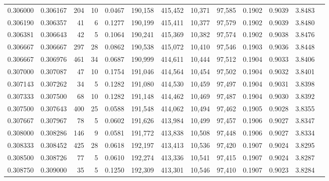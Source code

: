\begin{tabular}{rrrrrrrrrrrrr}
0.306000 & 0.306167 &   204 &  10 &                                     0.0467 & 190,158 & 415,452 &  10,371 &  97,585 & 0.1902 & 0.9039 & 3.8483 \\
0.306190 & 0.306357 &    41 &   6 &                                     0.1277 & 190,199 & 415,411 &  10,377 &  97,579 & 0.1902 & 0.9039 & 3.8480 \\
0.306381 & 0.306643 &    42 &   5 &                                     0.1064 & 190,241 & 415,369 &  10,382 &  97,574 & 0.1902 & 0.9038 & 3.8476 \\
0.306667 & 0.306667 &   297 &  28 &                                     0.0862 & 190,538 & 415,072 &  10,410 &  97,546 & 0.1903 & 0.9036 & 3.8448 \\
0.306667 & 0.306976 &   461 &  34 &                                     0.0687 & 190,999 & 414,611 &  10,444 &  97,512 & 0.1904 & 0.9033 & 3.8406 \\
0.307000 & 0.307087 &    47 &  10 &                                     0.1754 & 191,046 & 414,564 &  10,454 &  97,502 & 0.1904 & 0.9032 & 3.8401 \\
0.307143 & 0.307262 &    34 &   5 &                                     0.1282 & 191,080 & 414,530 &  10,459 &  97,497 & 0.1904 & 0.9031 & 3.8398 \\
0.307333 & 0.307500 &    68 &  10 &                                     0.1282 & 191,148 & 414,462 &  10,469 &  97,487 & 0.1904 & 0.9030 & 3.8392 \\
0.307500 & 0.307643 &   400 &  25 &                                     0.0588 & 191,548 & 414,062 &  10,494 &  97,462 & 0.1905 & 0.9028 & 3.8355 \\
0.307667 & 0.307967 &    78 &   5 &                                     0.0602 & 191,626 & 413,984 &  10,499 &  97,457 & 0.1906 & 0.9027 & 3.8347 \\
0.308000 & 0.308286 &   146 &   9 &                                     0.0581 & 191,772 & 413,838 &  10,508 &  97,448 & 0.1906 & 0.9027 & 3.8334 \\
0.308333 & 0.308452 &   425 &  28 &                                     0.0618 & 192,197 & 413,413 &  10,536 &  97,420 & 0.1907 & 0.9024 & 3.8295 \\
0.308500 & 0.308726 &    77 &   5 &                                     0.0610 & 192,274 & 413,336 &  10,541 &  97,415 & 0.1907 & 0.9024 & 3.8287 \\
0.308750 & 0.309000 &    35 &   5 &                                     0.1250 & 192,309 & 413,301 &  10,546 &  97,410 & 0.1907 & 0.9023 & 3.8284 \\

\end{tabular}
